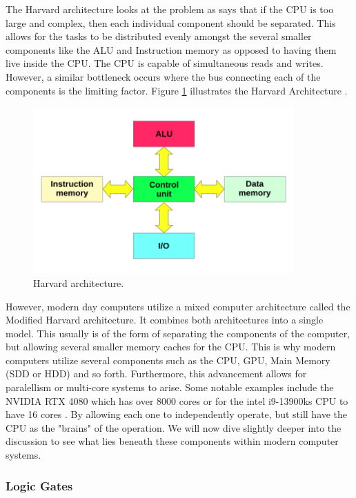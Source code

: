 The Harvard architecture looks at the problem as says that if the CPU is too large and complex, then each individual component should be separated.
This allows for the tasks to be distributed evenly amongst the several smaller components like the ALU and Instruction memory as opposed to having them live inside the CPU.
The CPU is capable of simultaneous reads and writes.
However, a similar bottleneck occurs where the bus connecting each of the components is the limiting factor.
Figure \ref{fig:HarvardArch} illustrates the Harvard Architecture \cite{HarvardArchImg}.

\begin{figure}[htb]
    \centering
    \includegraphics[width=10cm]{Images/Harvard_architecture.svg.png}
       \caption{Harvard architecture.}
           \label{fig:HarvardArch}
\end{figure}

However, modern day computers utilize a mixed computer architecture called the Modified Harvard architecture.
It combines both architectures into a single model.
This usually is of the form of separating the components of the computer, but allowing several smaller memory caches for the CPU.
This is why modern computers utilize several components such as the CPU, GPU, Main Memory (SDD or HDD) and so forth.
Furthermore, this advancement allows for paralellism or multi-core systems to arise.
Some notable examples include the NVIDIA RTX 4080 which has over 8000 cores or for the intel i9-13900ks CPU to have 16 cores \cite{4080Specs,IntelSpecs}.
By allowing each one to independently operate, but still have the CPU as the "brains" of the operation.
We will now dive slightly deeper into the discussion to see what lies beneath these components within modern computer systems.

\subsubsection{Logic Gates}\label{subsec:LogicGates}

